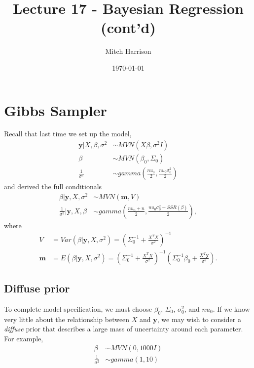 \documentclass[titlepage, 12pt, leqno]{article}
\title{\Huge{Lecture 17 - Bayesian Regression (cont'd)}}
\author{\large{Mitch Harrison}}
\date{\today}
\begin{document}
\setlength{\parskip}{1\baselineskip}
\setlength{\parindent}{15pt}
\maketitle
\tableofcontents
\newpage


\section{Gibbs Sampler}

Recall that last time we set up the model,
\begin{align*}
    \textbf{y}|X,\beta,\sigma^{2} & \sim MVN(X\beta, \sigma^{2}I)\\
    \beta & \sim MVN(\beta_{0}, \Sigma_{0})\\
    \frac{1}{\sigma^{2}} & \sim gamma\left(\frac{nu_{0}}{2},
        \frac{nu_{0}\sigma^{2}_{0}}{2}\right)
\end{align*}
and derived the full conditionals
\begin{align*}
    \beta|\textbf{y},X,\sigma^{2} & \sim MVN(\textbf{m},V)\\
    \frac{1}{\sigma^{2}}|\textbf{y},X,\beta & \sim gamma\left(
        \frac{nu_{0}+n}{2},\frac{nu_{0}\sigma^{2}_{0}+SSR(\beta)}{2}\right),
\end{align*}
where
\begin{align*}
    V &= Var(\beta|\textbf{y},X,\sigma^{2}) = \left(\Sigma_{0}^{-1} +
        \frac{X^{T}X}{\sigma^{2}}\right)^{-1}\\
    \textbf{m} &= E(\beta|\textbf{y},X,\sigma^{2}) = \left(\Sigma_{0}^{-1} +
        \frac{X^{T}X}{\sigma^{2}}\right)^{-1}\left(\Sigma_{0}^{-1}\beta_{0}+
        \frac{X^{T}\textbf{y}}{\sigma^{2}}\right).
\end{align*}

\subsection{Diffuse prior}
To complete model specification, we must choose $\beta_{0}$, $\Sigma_{0}$,
$\sigma^{2}_{0}$, and $nu_{0}$. If we know very little about the relationship
between $X$ and $\textbf{y}$, we may wish to consider a \textit{diffuse} prior
that describes a large mass of uncertainty around each parameter. For example,
\begin{align*}
    \beta & \sim MVN(0,1000I)\\
    \frac{1}{\sigma^{2}} & \sim gamma(1, 10)
\end{align*}
\end{document}
